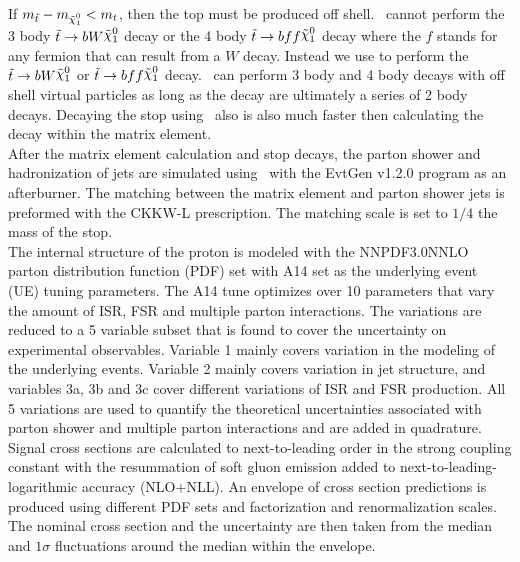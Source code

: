 \indent If $m_{\stop} - m_{\ninoone} < m_{t}$, then the top must be produced off shell.   \pythiaeight\ cannot perform the 3 body $\stop \rightarrow b W \ninoone$ decay or the 4 body $\stop \rightarrow b f f \ninoone$ decay where the $f$ stands for any fermion that can result from a $W$ decay.  Instead we use \madspin\cite{Madspin} to perform the $\stop \rightarrow b W \ninoone$ or $\stop \rightarrow b ff \ninoone$ decay.  \madspin\ can perform 3 body and 4 body decays with off shell virtual particles as long as the decay are ultimately a series of 2 body decays.  Decaying the stop using \madspin\ also is also much faster then calculating the decay within the matrix element.  \\ %

\indent After the matrix element calculation and stop decays, the parton shower and hadronization of jets are simulated using \pythiaeight\ with the {\sc EvtGen} v1.2.0 program as an afterburner.  The matching between the matrix element and parton shower jets is preformed with the CKKW-L prescription.   The matching scale is set to $1/4$ the mass of the stop. \\

\indent The internal structure of the proton is modeled with the NNPDF3.0NNLO parton distribution function (PDF) set \cite{NNPDF3.0} with A14 set as the underlying event (UE) tuning parameters\cite{Pythia8tunes}.  The A14 tune optimizes over 10 parameters that vary the amount of ISR, FSR and multiple parton interactions.  The variations are reduced to a 5 variable subset that is found to cover the uncertainty on experimental observables.  Variable 1 mainly covers variation in the modeling of the underlying events.  Variable 2 mainly covers variation in jet structure, and variables 3a, 3b and 3c cover different variations of ISR and FSR production.  All 5 variations are used to quantify the theoretical uncertainties associated with parton shower and multiple parton interactions and are added in quadrature.\\

\indent Signal cross sections are calculated to next-to-leading order in the strong coupling constant with the resummation of soft gluon emission added to next-to-leading-logarithmic accuracy (NLO+NLL).\cite{stopXsec}  An envelope of cross section predictions is produced using different PDF sets and factorization and renormalization scales.  The nominal cross section and the uncertainty are then taken from the median and $1\sigma$ fluctuations around the median within the envelope.  \\

